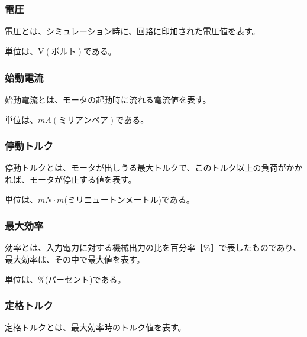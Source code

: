 \subsubsection{電圧}\label{sub:sub:dennatu}
電圧とは、シミュレーション時に、回路に印加された電圧値を表す。

単位は、$ \mathrm{V}(ボルト)$である。
\subsubsection{始動電流}\label{sub:sub:sidouden}
始動電流とは、モータの起動時に流れる電流値を表す。

単位は、$mA(ミリアンペア)$である。
\subsubsection{停動トルク}\label{sub:sub:teidoutoruku}
停動トルクとは、モータが出しうる最大トルクで、このトルク以上の負荷がかかれば、モータが停止する値を表す。

単位は、$mN \cdot m$(ミリニュートンメートル)である。
\subsubsection{最大効率}\label{sub:sub:saidaikouritu}
効率とは、入力電力に対する機械出力の比を百分率［\%］で表したものであり、最大効率は、その中で最大値を表す。

単位は、\%(パーセント)である。
\subsubsection{定格トルク}\label{sub:sub:teikakutoruku}
定格トルクとは、最大効率時のトルク値を表す。

